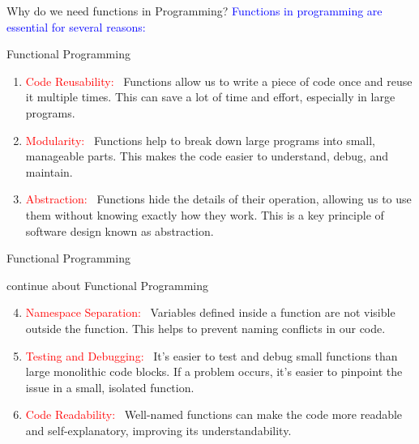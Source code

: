 \documentclass{beamer}\usepackage[]{graphicx}\usepackage[]{xcolor}
\begin{document}
    \begin{frame}{Why do we need functions in Programming?}
    \textcolor{blue}{Functions in programming are essential for several reasons:}

    \begin{block}{Functional Programming}
        \begin{enumerate}

            \item \textcolor{red}{Code Reusability:}~ Functions allow us to write a piece of code once and reuse it multiple times. This can save a lot of time and effort, especially in large programs.
            
            \item \textcolor{red}{Modularity:}~ Functions help to break down large programs into small, manageable parts. This makes the code easier to understand, debug, and maintain.
            
            \item \textcolor{red}{Abstraction:}~ Functions hide the details of their operation, allowing us to use them without knowing exactly how they work. This is a key principle of software design known as abstraction.
            
        \end{enumerate}
    \end{block}
\end{frame}


\begin{frame}{Functional Programming}
\begin{block}{continue about Functional Programming}
    \begin{enumerate}
        \setcounter{enumi}{3}
        \item  \textcolor{red}{Namespace Separation:}~ Variables defined inside a function are not visible outside the function. This helps to prevent naming conflicts in our code.
            
        \item \textcolor{red}{Testing and Debugging:}~ It's easier to test and debug small functions than large monolithic code blocks. If a problem occurs, it's easier to pinpoint the issue in a small, isolated function.
        
        \item \textcolor{red}{Code Readability:}~ Well-named functions can make the code more readable and self-explanatory, improving its understandability.
        
    \end{enumerate}
\end{block}

\end{frame}
\end{document}
